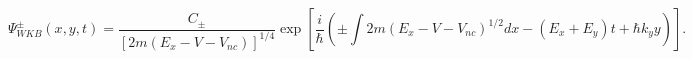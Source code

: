 \begin{equation}
\Psi_{WKB}^{\pm}(x,y,t)=\frac{C_{\pm}}{\left[  2m\left(  E_{x}-V-V_{nc}%
\right)  \right]  ^{1/4}}\exp\left[  \frac{i}{\hbar}\left(  \pm\int2m\left(
E_{x}-V-V_{nc}\right)  ^{1/2}dx-\left(  E_{x}+E_{y}\right)  t+\hbar
k_{y}y\right)  \right]  .\label{64}%
\end{equation}

